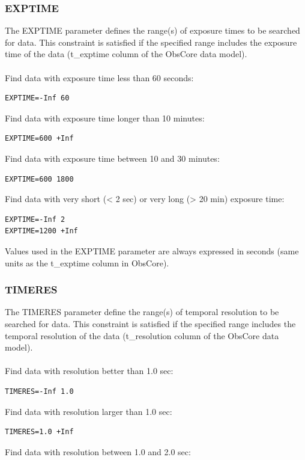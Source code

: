 \documentclass[11pt,a4paper]{ivoa}
\begin{document}
\subsubsection{EXPTIME}

The EXPTIME parameter defines the range(s) of exposure times to be searched for data. This constraint is satisfied if the specified range includes the exposure time of the data (t\_exptime column of the ObsCore  data model). \\ \\
Find data with exposure time less than  60 seconds:

\begin{lstlisting}
EXPTIME=-Inf 60
\end{lstlisting}
Find data with exposure time longer than 10 minutes:

\begin{lstlisting}
EXPTIME=600 +Inf
\end{lstlisting}
Find data with exposure time between 10 and 30 minutes:

\begin{lstlisting}
EXPTIME=600 1800
\end{lstlisting}
Find data with very short (< 2 sec) or very long (> 20 min) exposure time:

\begin{lstlisting}
EXPTIME=-Inf 2
EXPTIME=1200 +Inf
\end{lstlisting}


Values used in the EXPTIME parameter are always expressed in seconds (same units as the t\_exptime column in ObsCore).

\subsubsection{TIMERES}
The TIMERES parameter define the range(s) of temporal resolution to be searched for data. This constraint is satisfied if the specified range includes the temporal resolution of the data (t\_resolution column of the ObsCore data model). \\ \\
Find data with resolution better than 1.0 sec:

\begin{lstlisting}
TIMERES=-Inf 1.0
\end{lstlisting}
Find data with resolution larger than 1.0 sec:

\begin{lstlisting}
TIMERES=1.0 +Inf
\end{lstlisting}
Find data with resolution between 1.0 and 2.0 sec:
\end{document}
